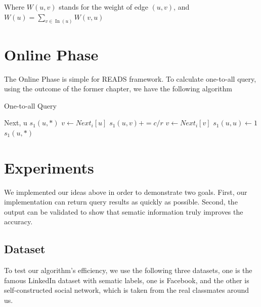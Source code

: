 \documentclass[a4paper, 12pt]{article} %
\begin{document}
    Where $W(u, v)$ stands for the weight of edge $(u, v)$, and $W(u) = \sum\limits_{v \in \operatorname{In}\left(u\right)} W(v, u)$
    
\bigskip


\section{Online Phase}

    The Online Phase is simple for READS framework. To calculate one-to-all query, using the outcome of the former chapter, we have the following algorithm
    
    \begin{algorithm}[H]
        \caption{One-to-all Query}
        \begin{algorithmic}[1]
            \Require Next, u
            \Ensure $s_1(u, *)$
                \State $v \gets Next_i[u]$
                    \State $s_1(u, v) += c/r$
                    \State $v \gets Next_i[v]$
                \EndWhile
            \EndFor
            \State $s_1(u, u) \gets 1$
            \Return $s_1(u, *)$
        \end{algorithmic}
    \end{algorithm}

\bigskip


\section{Experiments}

    We implemented our ideas above in order to demonstrate two goals. First, our implementation can return query results as quickly as possible. Second, the output can be validated to show that sematic information truly improves the accuracy.

    \subsection{\textbf{Dataset}}
    
    To test our algorithm's efficiency, we use the following three datasets, one is the famous LinkedIn dataset with sematic labels, one is Facebook, and the other is self-constructed social network, which is taken from the real classmates around us.
    
\end{document}

